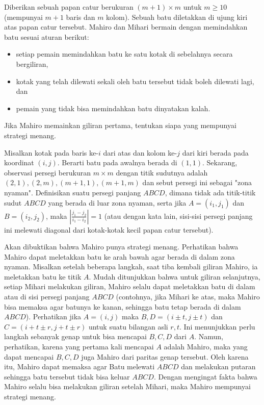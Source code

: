 \documentclass[11pt]{scrartcl}
\begin{document}
\begin{soaljawab}
    Diberikan sebuah papan catur berukuran $(m+1) \times m$ untuk $m \ge 10$ (mempunyai $m+1$ baris dan $m$ kolom). Sebuah batu diletakkan di ujung kiri atas papan catur tersebut. Mahiro dan Mihari bermain dengan memindahkan batu sesuai aturan berikut:
    \begin{itemize}
        \item setiap pemain memindahkan batu ke satu kotak di sebelahnya secara bergiliran,
        \item kotak yang telah dilewati sekali oleh batu tersebut tidak boleh dilewati lagi, dan
        \item pemain yang tidak bisa memindahkan batu dinyatakan kalah.
    \end{itemize}
    Jika Mahiro memainkan giliran pertama, tentukan siapa yang mempunyai strategi menang.
    \begin{solusi}
        Misalkan kotak pada baris ke-$i$ dari atas dan kolom ke-$j$ dari kiri berada pada koordinat $(i,j)$. Berarti batu pada awalnya berada di $(1,1)$. Sekarang, observasi persegi berukuran $m \times m$ dengan titik sudutnya adalah  $(2,1), (2,m), (m+1,1), (m+1, m)$ dan sebut persegi ini sebagai "zona nyaman". Definisikan suatu persegi panjang $ABCD$, dimana tidak ada titik-titik sudut $ABCD$ yang berada di luar zona nyaman, serta jika $A=(i_1, j_1)$ dan $B=(i_2,j_2)$, maka $\left|\frac{j_1-j_2}{i_1-i_2}\right| = 1$ (atau dengan kata lain, sisi-sisi persegi panjang ini melewati diagonal dari kotak-kotak kecil papan catur tersebut).

        Akan dibuktikan bahwa Mahiro punya strategi menang. Perhatikan bahwa Mahiro dapat meletakkan batu ke arah bawah agar berada di dalam zona nyaman. Misalkan setelah beberapa langkah, saat tiba kembali giliran Mahiro, ia meletakkan batu ke titik $A$. Mudah ditunjukkan bahwa untuk giliran selanjutnya, setiap  Mihari melakukan giliran, Mahiro selalu dapat meletakkan batu di dalam atau di sisi persegi panjang $ABCD$ (contohnya, jika Mihari ke atas, maka Mahiro bisa memaksa agar batunya ke kanan, sehingga batu tetap berada di dalam $ABCD$). Perhatikan jika $A=(i,j)$ maka $B,D = (i\pm t, j \pm t)$ dan $C=(i + t  \pm r, j + t \pm r)$ untuk suatu bilangan asli $r,t$. Ini menunjukkan perlu langkah sebanyak genap untuk bisa mencapai $B,C,D$ dari $A$. Namun, perhatikan, karena yang pertama kali mencapai $A$ adalah Mahiro, maka yang dapat mencapai $B,C,D$ juga Mahiro dari paritas genap tersebut. Oleh karena itu, Mahiro dapat memaksa agar Batu melewati $ABCD$ dan melakukan putaran sehingga batu tersebut tidak bisa keluar $ABCD$. Dengan mengingat fakta bahwa Mahiro selalu bisa melakukan giliran setelah Mihari, maka Mahiro mempunyai strategi menang.
    \end{solusi}
\end{soaljawab}
\end{document}
